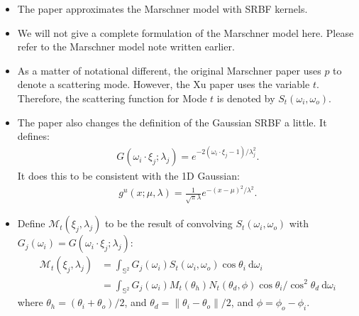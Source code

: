 \documentclass[10pt]{article}
\newcommand{\dee}{\mathrm{d}}
\newcommand{\sphere}{\mathbb{S}^2}
\newcommand{\modeint}{\mathcal{M}}
\begin{document}
  \begin{itemize}
    \item The paper approximates the Marschner model with SRBF kernels.
    
    \item We will not give a complete formulation of the Marschner model here. Please refer to the Marschner model note written earlier.
    
    \item As a matter of notational different, the original Marschner paper uses $p$ to denote a scattering mode. However, the Xu paper uses the variable $t$. Therefore, the scattering function for Mode $t$ is denoted by $S_t(\omega_i, \omega_o)$.
    
    \item The paper also changes the definition of the Gaussian SRBF a little. It defines:
      \begin{align*}
        G(\omega_i \cdot \xi_j; \lambda_j) = e^{-2(\omega_i \cdot \xi_j -1)/\lambda_j^2}.
      \end{align*}
      It does this to be consistent with the 1D Gaussian:
      \begin{align*}
        g^u(x; \mu, \lambda) = \frac{1}{\sqrt{\pi} \lambda}e^{-(x-\mu)^2/\lambda^2}.
      \end{align*}
    
    \item Define $\modeint_t(\xi_j, \lambda_j)$ to be the result of convolving $S_t(\omega_i, \omega_o)$ with $G_j(\omega_i) = G(\omega_i \cdot \xi_j; \lambda_j)$:
    \begin{align*}
      \modeint_t(\xi_j, \lambda_j) 
      &= \int_{\sphere} G_j(\omega_i) S_t(\omega_i, \omega_o) \cos \theta_i\ \dee\omega_i\\
      &= \int_{\sphere} G_j(\omega_i) M_t(\theta_h) N_t(\theta_d, \phi) \cos \theta_i / \cos^2 \theta_d\ \dee\omega_i
    \end{align*}
    where $\theta_h = (\theta_i + \theta_o) / 2$, and $\theta_d = \| \theta_i - \theta_o \| / 2$, and $\phi = \phi_o - \phi_i$.
    

\end{itemize}
\end{document}
